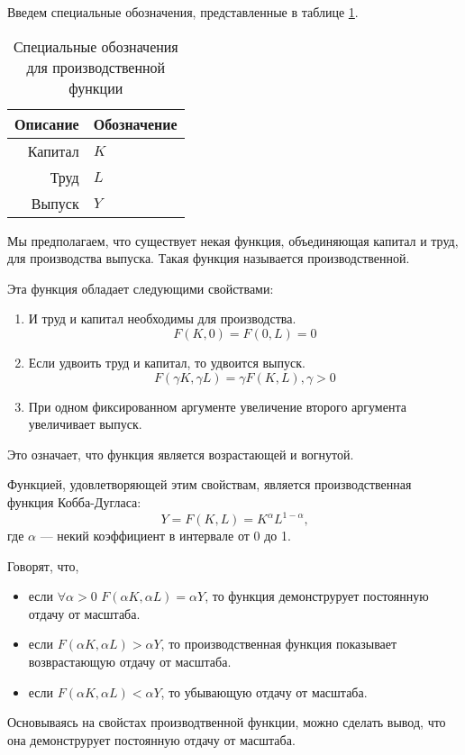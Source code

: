 Введем специальные обозначения, представленные в таблице \ref{tab:prod_func}.
\begin{table}[ht]
	\centering
	\caption{Специальные обозначения для производственной функции}
	\begin{tabular}{|r|l|}
		\hline
		Описание & Обозначение \\ \hline
		Капитал  &      $K$    \\
		Труд     &      $L$    \\
		Выпуск   &      $Y$    \\ \hline
		\end{tabular}%
	\label{tab:prod_func}
\end{table}
Мы предполагаем, что существует некая функция, объединяющая капитал и труд, для производства выпуска.
Такая функция называется производственной.

Эта функция обладает следующими свойствами:
\begin{enumerate}
	\item И труд и капитал необходимы для производства.
	\[
		F(K, 0) = F(0, L) = 0
	\]
	\item Если удвоить труд и капитал, то удвоится выпуск.
	\[
		F(\gamma K, \gamma L) = \gamma F(K, L), \gamma > 0
	\]
	\item При одном фиксированном аргументе увеличение второго аргумента увеличивает выпуск.
\end{enumerate}
Это означает, что функция является возрастающей и вогнутой.

Функцией, удовлетворяющей этим свойствам, является производственная функция Кобба-Дугласа:
\begin{equation}
	Y = F(K, L) = K^{\alpha}L^{1-\alpha}\text{,}
\label{F:Cob_Duglas}
\end{equation}
где $\alpha$ --- некий коэффициент в интервале от 0 до 1.

Говорят, что,
\begin{itemize}
\item если $\forall \alpha>0$ $F(\alpha K, \alpha L) = \alpha Y$, то функция демонструрует постоянную отдачу от масштаба.
\item если $F(\alpha K, \alpha L) > \alpha Y$, то производственная функция показывает возврастающую отдачу от масштаба.
\item если $F(\alpha K, \alpha L) < \alpha Y$, то убывающую отдачу от масштаба.
\end{itemize}
Основываясь на свойстах производтвенной функции, можно сделать вывод, что она демонструрует постоянную отдачу от масштаба.


